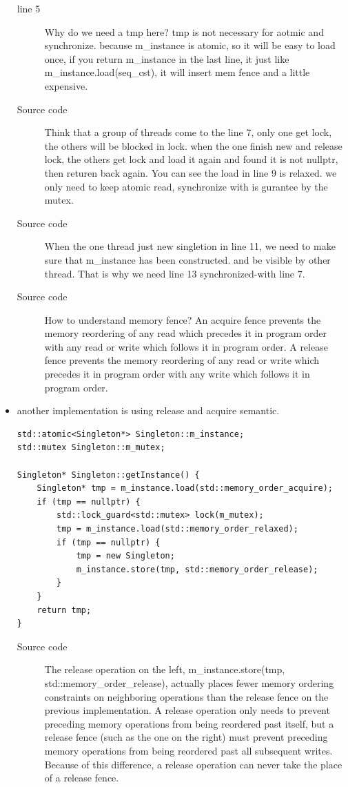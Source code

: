 \documentclass[a4paper,11pt,twoside]{book}
\begin{document}
\begin{itemize}
\begin{description}
    \item[line 5] Why do we need a tmp here? tmp is not necessary for aotmic and synchronize. because m\_instance is atomic, so it will be easy to load once, if you return m\_instance in the last line, it just like m\_instance.load(seq\_cst), it will insert mem fence and a little expensive. 

    \item [Source code] Think that a group of threads come to the line 7,  only one get lock, the others will be blocked in lock. when the one finish new and release lock, the others get lock and load it again and found it is not nullptr, then returen back again.  You can see the load in line 9 is relaxed. we only need to keep atomic read, synchronize with is gurantee by the mutex. 
    \item [Source code] When the one thread just new singletion in line 11, we need to make sure that m\_instance has been constructed. and be visible by other thread. That is why we need line 13 synchronized-with line 7. 

    \item [Source code] How to understand memory fence? An acquire fence prevents the memory reordering of any read which precedes it in program order with any read or write which follows it in program order. A release fence prevents the memory reordering of any read or write which precedes it in program order with any write which follows it in program order.
\end{description}

    \item another implementation is using release and acquire semantic.
\begin{lstlisting}[]
std::atomic<Singleton*> Singleton::m_instance;
std::mutex Singleton::m_mutex;

Singleton* Singleton::getInstance() {
    Singleton* tmp = m_instance.load(std::memory_order_acquire);
    if (tmp == nullptr) {
        std::lock_guard<std::mutex> lock(m_mutex);
        tmp = m_instance.load(std::memory_order_relaxed);
        if (tmp == nullptr) {
            tmp = new Singleton;
            m_instance.store(tmp, std::memory_order_release);
        }
    }
    return tmp;
}
\end{lstlisting}
\begin{description}
    \item[Source code] The release operation on the left, m\_instance.store(tmp, std::memory\_order\_release), actually places fewer memory ordering constraints on neighboring operations than the release fence on the previous implementation. A release operation only needs to prevent preceding memory operations from being reordered past itself, but a release fence (such as the one on the right) must prevent preceding memory operations from being reordered past all subsequent writes. Because of this difference, a release operation can never take the place of a release fence.
\end{description}


\end{itemize}
\end{document}
